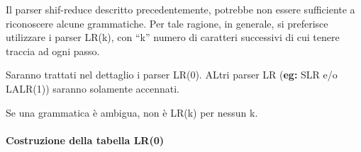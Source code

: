 \documentclass{subfiles}
\begin{document}
Il parser shif-reduce descritto precedentemente, potrebbe non essere sufficiente a riconoscere alcune grammatiche.
Per tale ragione, in generale, si preferisce utilizzare i parser LR(k), con ``k'' numero di caratteri successivi di cui tenere traccia ad ogni passo.

\begin{Note*}
    Saranno trattati nel dettaglio i parser LR(0). ALtri parser LR (\textbf{eg:} SLR e/o LALR(1)) saranno solamente accennati.
\end{Note*}

\begin{Remark*}
    Se una grammatica è ambigua, non è LR(k) per nessun k.
\end{Remark*}

\paragraph{Costruzione della tabella LR(0)}

\end{document}
